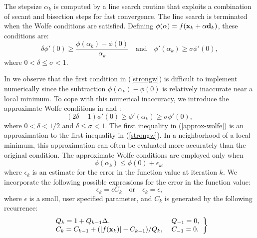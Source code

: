 \documentclass [12pt] {article}
\newcommand{\m}[1]{{\bf{#1}}}
\begin{document}
The stepsize $\alpha_k$ is computed by a line search routine
that exploits a combination of secant and bisection steps for
fast convergence.
The line search is terminated when the
Wolfe conditions \cite{w69,w71} are satisfied.
Defining $\phi (\alpha) = f (\m{x}_k + \alpha \m{d}_k)$,
these conditions are:
%
\begin{equation}\label{strongw}
\delta \phi ' (0) \ge \frac{\phi(\alpha_k) - \phi (0)}{\alpha_k} \quad
\mbox{and} \quad
\phi ' (\alpha_k) \ge \sigma \phi ' (0) ,
\end{equation}
%
where $0 < \delta \le \sigma < 1$.

In \cite{hz} we observe that the first condition in (\ref{strongw})
is difficult to implement numerically
since the subtraction $\phi(\alpha_k) - \phi (0)$
is relatively inaccurate near a local minimum.
To cope with this numerical inaccuracy,
we introduce the approximate Wolfe conditions
in \cite{hz} and \cite{hz2}:
%
\begin{equation}\label{approx-wolfe}
(2\delta -1 ) \phi ' (0) \ge \phi ' (\alpha_k) \ge \sigma \phi ' (0) ,
\end{equation}
%
where $0 < \delta < 1/2$ and $\delta \le \sigma < 1$.
The first inequality in (\ref{approx-wolfe}) is an approximation
to the first inequality in (\ref{strongw}).
In a neighborhood of a local minimum, this approximation can often
be evaluated more accurately than the original condition.
The approximate Wolfe conditions are employed only when
%
\begin{equation}\label{function_accuracy}
\phi (\alpha_k) \le \phi (0) +  \epsilon_k ,
\end{equation}
%
where $\epsilon_k$ is an estimate for the error in the function value
at iteration $k$.
We incorporate the following possible expressions for the
error in the function value:
%
\begin{equation}\label{eps_k}
\epsilon_k = \epsilon C_k  \quad \mbox{or} \quad
\epsilon_k = \epsilon ,
\end{equation}
%
where $\epsilon$ is a small, user specified parameter, and $C_k$ is
generated by the following recurrence:
\begin{equation}\label{Ck}
\left.
\begin{array}{ll}
Q_{k} = 1 + Q_{k-1} \Delta , &\; Q_{-1} = 0 , \\
C_{k} = C_{k-1} + (|f(\m{x}_{k})| - C_{k-1})/Q_k, &\; C_{-1} = 0. \\
\end{array} \right\}
\end{equation}
\end{document}
